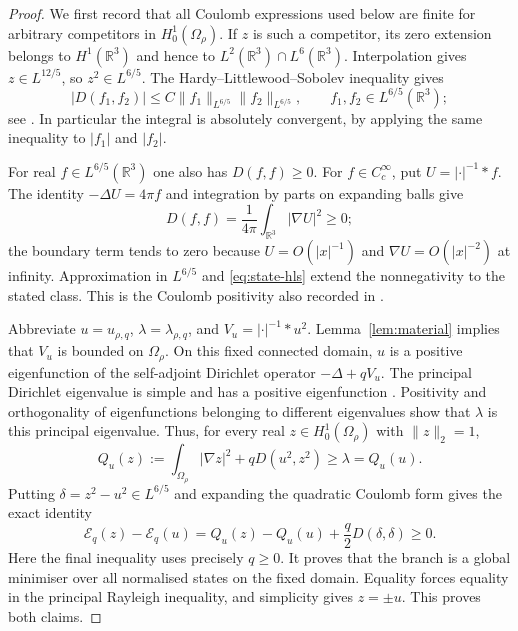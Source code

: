 \documentclass[11pt,a4paper]{article}
\theoremstyle{definition}
\theoremstyle{remark}
\begin{document}
\begin{proof}
We first record that all Coulomb expressions used below are finite for
arbitrary competitors in $H^1_0(\Omega_\rho)$.  If $z$ is such a
competitor, its zero extension belongs to $H^1(\mathbb R^3)$ and hence
to $L^2(\mathbb R^3)\cap L^6(\mathbb R^3)$.  Interpolation gives
$z\in L^{12/5}$, so $z^2\in L^{6/5}$.  The
Hardy--Littlewood--Sobolev inequality gives
\begin{equation}
 |D(f_1,f_2)|\leq C\|f_1\|_{L^{6/5}}\|f_2\|_{L^{6/5}},
 \qquad f_1,f_2\in L^{6/5}(\mathbb R^3);
 \label{eq:state-hls}
\end{equation}
see \cite[Theorem~4.3]{LiebLoss2001}.  In particular the integral is
absolutely convergent, by applying the same inequality to $|f_1|$ and
$|f_2|$.

For real $f\in L^{6/5}(\mathbb R^3)$ one also has $D(f,f)\geq0$.
For $f\in C_c^\infty$, put $U=|\cdot|^{-1}*f$.  The identity
$-\Delta U=4\pi f$ and integration by parts on expanding balls give
\[
 D(f,f)=\frac1{4\pi}\int_{\mathbb R^3}|\nabla U|^2\geq0;
\]
the boundary term tends to zero because $U=O(|x|^{-1})$ and
$\nabla U=O(|x|^{-2})$ at infinity.  Approximation in $L^{6/5}$ and
\eqref{eq:state-hls} extend the nonnegativity to the stated class.
This is the Coulomb positivity also recorded in
\cite[Section~2, p.~1034]{MMR2025}.

Abbreviate $u=u_{\rho,q}$, $\lambda=\lambda_{\rho,q}$, and
$V_u=|\cdot|^{-1}*u^2$.  Lemma~\ref{lem:material} implies that $V_u$
is bounded on $\Omega_\rho$.  On this fixed connected domain, $u$ is
a positive eigenfunction of the self-adjoint Dirichlet operator
$-\Delta+qV_u$.  The principal Dirichlet eigenvalue is simple and
has a positive eigenfunction \cite[Theorem~8.38]{GT2001}.  Positivity
and orthogonality of eigenfunctions belonging to different eigenvalues
show that $\lambda$ is this principal eigenvalue.  Thus, for every
real $z\in H^1_0(\Omega_\rho)$ with $\|z\|_2=1$,
\[
 Q_u(z):=\int_{\Omega_\rho}|\nabla z|^2+qD(u^2,z^2)
         \geq\lambda=Q_u(u).
\]
Putting $\delta=z^2-u^2\in L^{6/5}$ and expanding the quadratic
Coulomb form gives the exact identity
\begin{equation}
 \mathcal E_q(z)-\mathcal E_q(u)
   =Q_u(z)-Q_u(u)+\frac q2D(\delta,\delta)\geq0.
 \label{eq:state-ground-state-identity}
\end{equation}
Here the final inequality uses precisely $q\geq0$.  It proves that
the branch is a global minimiser over all normalised states on the
fixed domain.  Equality forces equality in the principal Rayleigh
inequality, and simplicity gives $z=\pm u$.  This proves both claims.
\end{proof}
\end{document}
